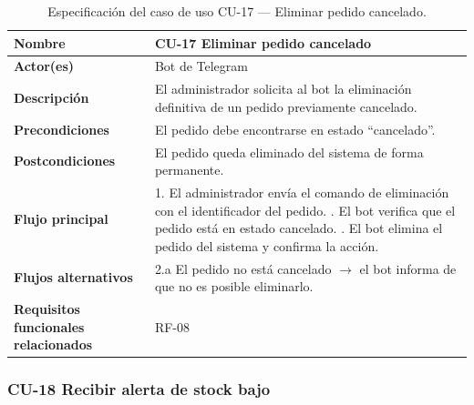 \begin{table}[H]
\centering
\small
\begin{tabular}{|m{}|m{}|}
\hline
\textbf{Nombre} & CU-17 Eliminar pedido cancelado \\ \hline
\textbf{Actor(es)} & Bot de Telegram \\ \hline
\textbf{Descripción} & El administrador solicita al bot la eliminación definitiva de un pedido previamente cancelado. \\ \hline
\textbf{Precondiciones} & El pedido debe encontrarse en estado ``cancelado''. \\ \hline
\textbf{Postcondiciones} & El pedido queda eliminado del sistema de forma permanente. \\ \hline
\textbf{Flujo principal} & 1. El administrador envía el comando de eliminación con el identificador del pedido. \newline 2. El bot verifica que el pedido está en estado cancelado. \newline 3. El bot elimina el pedido del sistema y confirma la acción. \\ \hline
\textbf{Flujos alternativos} & 2.a El pedido no está cancelado $\rightarrow$ el bot informa de que no es posible eliminarlo. \\ \hline
\textbf{Requisitos funcionales relacionados} & RF-08 \\ \hline
\end{tabular}
\caption{Especificación del caso de uso CU-17 — Eliminar pedido cancelado.}
\end{table}

\clearpage

\subsubsection{CU-18 Recibir alerta de stock bajo}

